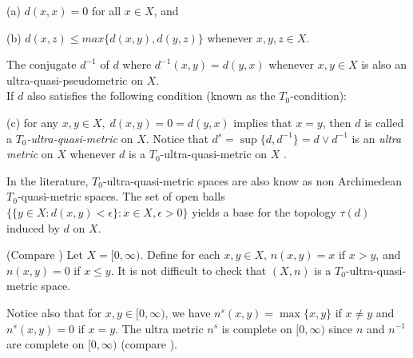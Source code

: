 \documentclass[10pt,a4paper]{article}
\begin{document}
(a) $d(x,x)=0$ for all $x\in X$, and 

(b) $d(x,z)\leq max\lbrace d(x,y),d(y,z)\rbrace$ whenever $x,y,z\in X$.

The conjugate $d^{-1}$ of $d$ where $d^{-1}(x,y)=d(y,x)$ whenever $x,y\in X$ is also an ultra-quasi-pseudometric on $X$.  \\
If $d$ also satisfies the following condition (known as the $T_0$-condition):

(c) for any $x,y\in X, \; d(x,y)=0=d(y,x)$ implies that $x=y$, then $d$ is called a {\em $T_0$-ultra-quasi-metric} on $X$. Notice that $d^s=\sup\lbrace d,d^{-1}\rbrace= d\vee d^{-1}$ is an {\em ultra metric} on $X$ whenever $d$ is a $T_0$-ultra-quasi-metric on $X$  .

In the literature, $T_0$-ultra-quasi-metric spaces are also know as non Archimedean $T_0$-quasi-metric spaces. The set of open balls $\lbrace \lbrace y\in X:d(x,y)<\epsilon\rbrace:x\in X, \epsilon>0\rbrace$ yields a base for the topology $\tau(d)$ induced by $d$ on $X$.

\example (Compare \cite[Example 3]{Bonsangue}) \label{Bon} Let $X=[0,\infty)$. Define for each $x,y\in X$, $n(x,y)=x$ if $x>y$, and $n(x,y)=0$ if $x\leq y$. It is not difficult to check that $(X,n)$ is a $T_0$-ultra-quasi-metric space.

Notice also that for $x,y\in [0,\infty)$, we have $n^s(x,y)=\max\lbrace x,y \rbrace$ if $x\neq y$ and $n^s(x,y)=0$ if $x=y$. The ultra metric $n^s$ is complete on $[0,\infty)$ since $n$ and $n^{-1}$ are complete on $[0,\infty)$ (compare \cite[Example 2]{KunziOlela}).
\end{document}
